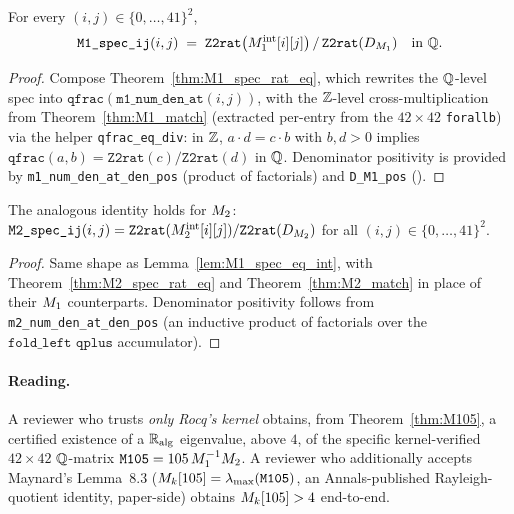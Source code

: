\begin{lemma}\label{lem:M1_spec_eq_int}
\rocqok
{}
For every $(i, j) \in \{0, \ldots, 41\}^2$,
\[
  \texttt{M1\_spec\_ij}(i, j)
    \;=\; \texttt{Z2rat}\bigl(M_1^{\mathrm{int}}[i][j]\bigr) \,/\,
          \texttt{Z2rat}(D_{M_1}) \quad\text{in } \mathbb{Q}.
\]
\end{lemma}
\begin{proof}\rocqok
Compose Theorem~\ref{thm:M1_spec_rat_eq}, which rewrites the
$\mathbb{Q}$-level spec into $\texttt{qfrac}(\texttt{m1\_num\_den\_at}(i,j))$,
with the $\mathbb{Z}$-level cross-multiplication from
Theorem~\ref{thm:M1_match} (extracted per-entry from the $42 \times 42$
\texttt{forallb}) via the helper
\texttt{qfrac\_eq\_div}: in $\mathbb{Z}$, $a\cdot d = c\cdot b$ with $b, d > 0$
implies $\texttt{qfrac}(a, b) = \texttt{Z2rat}(c)/\texttt{Z2rat}(d)$ in
$\mathbb{Q}$. Denominator positivity is provided by
\texttt{m1\_num\_den\_at\_den\_pos} (product of factorials) and
\texttt{D\_M1\_pos} (\vmcompute).
\end{proof}

\begin{lemma}\label{lem:M2_spec_eq_int}
\rocqok
{}
The analogous identity holds for $M_2$:
$\texttt{M2\_spec\_ij}(i, j)
  = \texttt{Z2rat}(M_2^{\mathrm{int}}[i][j]) / \texttt{Z2rat}(D_{M_2})$
for all $(i, j) \in \{0, \ldots, 41\}^2$.
\end{lemma}
\begin{proof}\rocqok
Same shape as Lemma~\ref{lem:M1_spec_eq_int}, with
Theorem~\ref{thm:M2_spec_rat_eq} and Theorem~\ref{thm:M2_match} in
place of their $M_1$ counterparts. Denominator positivity follows
from \texttt{m2\_num\_den\_at\_den\_pos} (an inductive product of
factorials over the $\texttt{fold\_left qplus}$ accumulator).
\end{proof}

\paragraph{Reading.}
A reviewer who trusts \emph{only Rocq's kernel} obtains, from
Theorem~\ref{thm:M105}, a certified existence of a $\mathbb{R}_{\mathrm{alg}}$
eigenvalue, above $4$, of the specific kernel-verified $42 \times 42$
$\mathbb{Q}$-matrix $\texttt{M105} = 105\,M_1^{-1}M_2$. A reviewer who
additionally accepts Maynard's Lemma~8.3 ($M_k[105] = \lambda_{\max}(\texttt{M105})$,
an Annals-published Rayleigh-quotient identity, paper-side) obtains
$M_k[105] > 4$ end-to-end.

